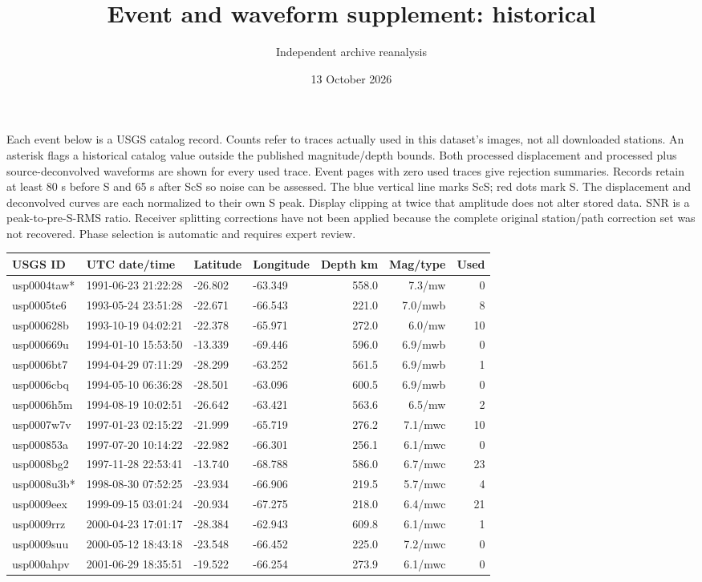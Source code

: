 \documentclass[10pt]{article}
\begin{document}
\title{Event and waveform supplement: historical}\author{Independent archive reanalysis}\date{13 October 2026}\maketitle
Each event below is a USGS catalog record. Counts refer to traces actually
used in this dataset's images, not all downloaded stations. An asterisk flags a
historical catalog value outside the published magnitude/depth bounds. Both
processed displacement and processed plus source-deconvolved waveforms are shown
for every used trace. Event pages with zero used traces give rejection summaries.
Records retain at least 80 s before S and 65 s after ScS so noise can be assessed.
The blue vertical line marks ScS; red dots mark S. The displacement and deconvolved
curves are each normalized to their own S peak. Display clipping at twice that
amplitude does not alter stored data. SNR is a peak-to-pre-S-RMS ratio.
Receiver splitting corrections have not been applied because the complete original station/path
correction set was not recovered. Phase selection is automatic and requires expert review.
\begingroup\small\setlength{\tabcolsep}{3pt}
\begin{longtable}{llllrrr}
\toprule USGS ID & UTC date/time & Latitude & Longitude & Depth km & Mag/type & Used\\\midrule\endhead
usp0004taw* & 1991-06-23 21:22:28 & -26.802 & -63.349 & 558.0 & 7.3/mw & 0 \\
usp0005te6 & 1993-05-24 23:51:28 & -22.671 & -66.543 & 221.0 & 7.0/mwb & 8 \\
usp000628b & 1993-10-19 04:02:21 & -22.378 & -65.971 & 272.0 & 6.0/mw & 10 \\
usp000669u & 1994-01-10 15:53:50 & -13.339 & -69.446 & 596.0 & 6.9/mwb & 0 \\
usp0006bt7 & 1994-04-29 07:11:29 & -28.299 & -63.252 & 561.5 & 6.9/mwb & 1 \\
usp0006cbq & 1994-05-10 06:36:28 & -28.501 & -63.096 & 600.5 & 6.9/mwb & 0 \\
usp0006h5m & 1994-08-19 10:02:51 & -26.642 & -63.421 & 563.6 & 6.5/mw & 2 \\
usp0007w7v & 1997-01-23 02:15:22 & -21.999 & -65.719 & 276.2 & 7.1/mwc & 10 \\
usp000853a & 1997-07-20 10:14:22 & -22.982 & -66.301 & 256.1 & 6.1/mwc & 0 \\
usp0008bg2 & 1997-11-28 22:53:41 & -13.740 & -68.788 & 586.0 & 6.7/mwc & 23 \\
usp0008u3b* & 1998-08-30 07:52:25 & -23.934 & -66.906 & 219.5 & 5.7/mwc & 4 \\
usp0009eex & 1999-09-15 03:01:24 & -20.934 & -67.275 & 218.0 & 6.4/mwc & 21 \\
usp0009rrz & 2000-04-23 17:01:17 & -28.384 & -62.943 & 609.8 & 6.1/mwc & 1 \\
usp0009suu & 2000-05-12 18:43:18 & -23.548 & -66.452 & 225.0 & 7.2/mwc & 0 \\
usp000ahpv & 2001-06-29 18:35:51 & -19.522 & -66.254 & 273.9 & 6.1/mwc & 0 \\
\bottomrule\end{longtable}\endgroup
\end{document}
